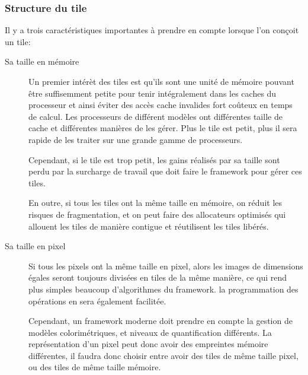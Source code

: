 		\subsubsection{Structure du tile}
			Il y a trois caractéristiques importantes à prendre en compte lorsque l'on conçoit un tile:
			\begin{description}
				\item[Sa taille en mémoire]Un premier intérèt des tiles est qu'ils sont une unité de mémoire pouvant être suffisemment petite
				pour tenir intégralement dans les caches du processeur et ainsi éviter des accès cache invalides fort coûteux en temps de calcul.
				Les processeurs de différent modèles ont différentes taille de cache et différentes manières de les gérer. Plus le tile est petit,
				plus il sera rapide de les traiter sur une grande gamme de processeurs.
				
				Cependant, si le tile est trop petit, les gains réalisés par sa taille sont perdu par la surcharge de travail que doit faire le
				framework pour gérer ces tiles. 

				En outre, si tous les tiles ont la même taille en mémoire, on réduit les risques de fragmentation, et on peut faire des
				allocateurs optimisés qui allouent les tiles de manière contigue et réutilisent les tiles libérés.

				\item[Sa taille en pixel] Si tous les pixels ont la même taille en pixel, alors les images de dimensions égales seront
				toujours divisées en tiles de la même manière, ce qui rend plus simples beaucoup d'algorithmes du framework.
				la programmation des opérations en sera également facilitée. 

				Cependant, un framework moderne doit prendre en compte la gestion de modèles colorimétriques, et niveaux de quantification
				différents. La représentation d'un pixel peut donc avoir des empreintes mémoire différentes, il faudra donc choisir entre
				avoir des tiles de même taille pixel, ou des tiles de même taille mémoire.


\end{description}
